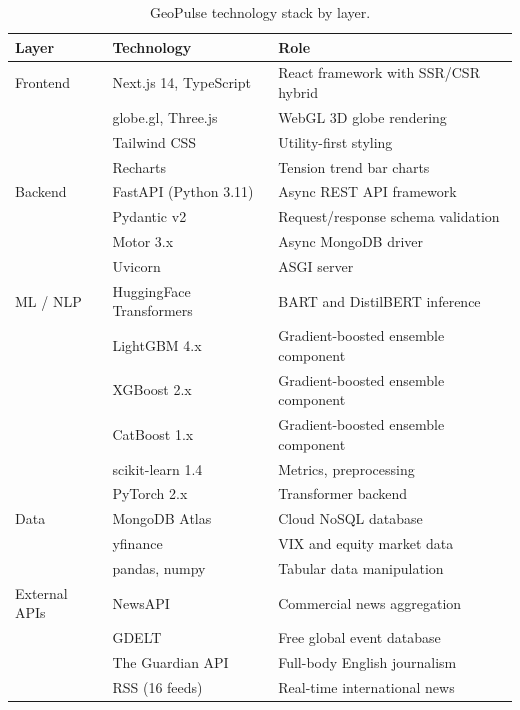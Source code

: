 \documentclass[12pt,a4paper]{report}
\begin{document}
\begin{table}[H]
\centering
\caption{GeoPulse technology stack by layer.}
\label{tab:techstack}
\begin{tabular}{p{2.8cm}p{4.0cm}p{6.2cm}}
\toprule
\textbf{Layer} & \textbf{Technology} & \textbf{Role} \\
\midrule
Frontend & Next.js 14, TypeScript & React framework with SSR/CSR hybrid \\
         & globe.gl, Three.js     & WebGL 3D globe rendering \\
         & Tailwind CSS           & Utility-first styling \\
         & Recharts               & Tension trend bar charts \\
\addlinespace[4pt]
Backend  & FastAPI (Python 3.11)  & Async REST API framework \\
         & Pydantic v2            & Request/response schema validation \\
         & Motor 3.x              & Async MongoDB driver \\
         & Uvicorn                & ASGI server \\
\addlinespace[4pt]
ML / NLP & HuggingFace Transformers & BART and DistilBERT inference \\
         & LightGBM 4.x           & Gradient-boosted ensemble component \\
         & XGBoost 2.x            & Gradient-boosted ensemble component \\
         & CatBoost 1.x           & Gradient-boosted ensemble component \\
         & scikit-learn 1.4       & Metrics, preprocessing \\
         & PyTorch 2.x            & Transformer backend \\
\addlinespace[4pt]
Data     & MongoDB Atlas          & Cloud NoSQL database \\
         & yfinance               & VIX and equity market data \\
         & pandas, numpy          & Tabular data manipulation \\
\addlinespace[4pt]
External APIs & NewsAPI            & Commercial news aggregation \\
              & GDELT              & Free global event database \cite{leetaru2013} \\
              & The Guardian API   & Full-body English journalism \\
              & RSS (16 feeds)     & Real-time international news \\
\bottomrule
\end{tabular}
\end{table}
\end{document}
